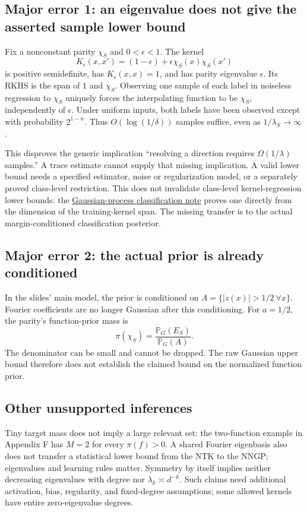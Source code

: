 \documentclass[11pt]{article}
\newcommand{\PP}{\mathbb P}
\begin{document}
\subsection*{Major error 1: an eigenvalue does not give the asserted sample lower bound}
Fix a nonconstant parity $\chi_S$ and $0<\epsilon<1$. The kernel
\[
 K_\epsilon(x,x')=(1-\epsilon)+\epsilon\chi_S(x)\chi_S(x')
\]
is positive semidefinite, has $K_\epsilon(x,x)=1$, and has parity eigenvalue $\epsilon$. Its RKHS is the span of $1$ and $\chi_S$. Observing one sample of each label in noiseless regression to $\chi_S$ uniquely forces the interpolating function to be $\chi_S$, independently of $\epsilon$. Under uniform inputs, both labels have been observed except with probability $2^{1-n}$. Thus $O(\log(1/\delta))$ samples suffice, even as $1/\lambda_S\to\infty$.

This disproves the generic implication ``resolving a direction requires $\Omega(1/\lambda)$ samples.'' A trace estimate cannot supply that missing implication. A valid lower bound needs a specified estimator, noise or regularization model, or a separately proved class-level restriction. This does not invalidate class-level kernel-regression lower bounds: the \href{https://github.com/kaarelh/AI-works/blob/main/neural-network-generalization/side-results/nngp-sample-complexity/paper.pdf}{Gaussian-process classification note} proves one directly from the dimension of the training-kernel span. The missing transfer is to the actual margin-conditioned classification posterior.

\subsection*{Major error 2: the actual prior is already conditioned}
In the slides' main model, the prior is conditioned on $A=\{|z(x)|>1/2\ \forall x\}$. Fourier coefficients are no longer Gaussian after this conditioning. For $a=1/2$, the parity's function-prior mass is
\[
 \pi(\chi_S)=\frac{\PP_G(E_S)}{\PP_G(A)}.
\]
The denominator can be small and cannot be dropped. The raw Gaussian upper bound therefore does not establish the claimed bound on the normalized function prior.

\subsection*{Other unsupported inferences}
Tiny target mass does not imply a large relevant set: the two-function example in Appendix F has $M=2$ for every $\pi(f)>0$. A shared Fourier eigenbasis also does not transfer a statistical lower bound from the NTK to the NNGP; eigenvalues and learning rules matter. Symmetry by itself implies neither decreasing eigenvalues with degree nor $\lambda_k\asymp d^{-k}$. Such claims need additional activation, bias, regularity, and fixed-degree assumptions; some allowed kernels have entire zero-eigenvalue degrees.
\end{document}
